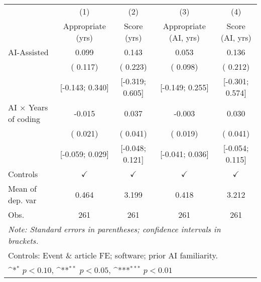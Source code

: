 \def\sym#1{\ifmmode^{#1}\else\(^{#1}\)\fi}
\begin{tabular}{l*{4}{c}}
\hline\hline
 & (1) & (2) & (3) & (4)
\\
 & Appropriate (yrs) & Score (yrs) & Appropriate (AI, yrs) & Score (AI, yrs)
 \\
\hline
AI-Assisted &  0.099 &  0.143 &  0.053 &  0.136
\\
 & ( 0.117) & ( 0.223) & ( 0.098) & ( 0.212)
\\
 & [-0.143;  0.340] & [-0.319;  0.605] & [-0.149;  0.255] & [-0.301;  0.574]
\\
AI × Years of coding & -0.015 &  0.037 & -0.003 &  0.030
\\
 & ( 0.021) & ( 0.041) & ( 0.019) & ( 0.041)
\\
 & [-0.059;  0.029] & [-0.048;  0.121] & [-0.041;  0.036] & [-0.054;  0.115]
\\
\hline
Controls & $\checkmark$ & $\checkmark$ & $\checkmark$ & $\checkmark$
\\
Mean of dep. var &  0.464 &  3.199 &  0.418 &  3.212
\\
Obs. & 261 & 261 & 261 & 261
\\
\hline
\hline\hline
\multicolumn{5}{l}{\it{Note:} Standard errors in parentheses; confidence intervals in brackets.}\\
\multicolumn{5}{l}{Controls: Event \& article FE; software; prior AI familiarity.}\\
\multicolumn{5}{l}{\sym{*} $p<0.10$, \sym{**} $p<0.05$,  \sym{***} $p<0.01$}\\
\end{tabular}
